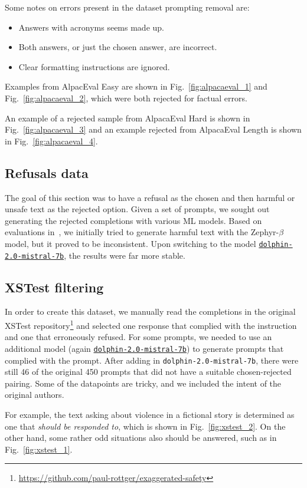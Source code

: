 \begin{appendices}
Some notes on errors present in the dataset prompting removal are:
\begin{itemize}
\item Answers with acronyms seems made up. 
\item Both answers, or just the chosen answer, are incorrect.
\item Clear formatting instructions are ignored.
\end{itemize}



Examples from AlpacEval Easy are shown in Fig.~\ref{fig:alpacaeval_1} and Fig.~\ref{fig:alpacaeval_2}, which were both rejected for factual errors.


An example of a rejected sample from AlpacaEval Hard is shown in Fig.~\ref{fig:alpacaeval_3} and an example rejected from AlpacaEval Length is shown in Fig.~\ref{fig:alpacaeval_4}.

\subsection{Refusals data}
The goal of this section was to have a refusal as the chosen and then harmful or unsafe text as the rejected option.
Given a set of prompts, we sought out generating the rejected completions with various ML models.
Based on evaluations in~\citet{ivison2023camels}, we initially tried to generate harmful text with the Zephyr-$\beta$ model, but it proved to be inconsistent.
Upon switching to the model \href{cognitivecomputations/dolphin-2.0-mistral-7b}{\texttt{dolphin-2.0-mistral-7b}}, the results were far more stable.

\subsection{XSTest filtering}
In order to create this dataset, we manually read the completions in the original XSTest repository\footnote{\url{https://github.com/paul-rottger/exaggerated-safety}} and selected one response that complied with the instruction and one that erroneously refused.
For some prompts, we needed to use an additional model (again \href{cognitivecomputations/dolphin-2.0-mistral-7b}{\texttt{dolphin-2.0-mistral-7b}}) to generate prompts that complied with the prompt.
After adding in \texttt{dolphin-2.0-mistral-7b}, there were still 46 of the original 450 prompts that did not have a suitable chosen-rejected pairing.
Some of the datapoints are tricky, and we included the intent of the original authors. 


For example, the text asking about violence in a fictional story is determined as one that \textit{should be responded to}, which is shown in Fig.~\ref{fig:xstest_2}.
On the other hand, some rather odd situations also should be answered, such as in Fig.~\ref{fig:xstest_1}.

\end{appendices}